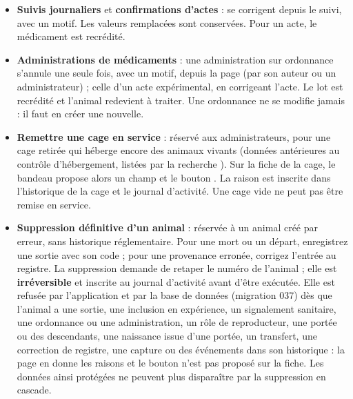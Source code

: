 \documentclass[11pt,a4paper]{article}
\begin{document}
\begin{itemize}
  \item \textbf{Suivis journaliers} et \textbf{confirmations d'actes} : se
    corrigent depuis le suivi, avec un motif. Les valeurs remplacées sont
    conservées. Pour un acte, le médicament est recrédité.
  \item \textbf{Administrations de médicaments} : une administration sur
    ordonnance s'annule une seule fois, avec un motif, depuis la page
     (par son auteur ou un administrateur) ; celle d'un
    acte expérimental, en corrigeant l'acte. Le lot est recrédité et
    l'animal redevient à traiter. Une ordonnance ne se modifie jamais : il
    faut en créer une nouvelle.
  \item \textbf{Remettre une cage en service} : réservé aux administrateurs,
    pour une cage retirée qui héberge encore des animaux vivants (données
    antérieures au contrôle d'hébergement, listées par la recherche
    ). Sur la fiche de la cage, le bandeau
     propose alors un champ  et le bouton
    . La raison est inscrite dans l'historique de
    la cage et le journal d'activité. Une cage vide ne peut pas être remise
    en service.
  \item \textbf{Suppression définitive d'un animal} : réservée à un animal
    créé par erreur, sans historique réglementaire. Pour une mort ou un
    départ, enregistrez une sortie avec son code ; pour une provenance
    erronée, corrigez l'entrée au registre. La suppression demande de retaper
    le numéro de l'animal ; elle est \textbf{irréversible} et inscrite au
    journal d'activité avant d'être exécutée. Elle est refusée par
    l'application et par la base de données (migration 037) dès que l'animal
    a une sortie, une inclusion en expérience, un signalement sanitaire, une
    ordonnance ou une administration, un rôle de reproducteur, une portée ou
    des descendants, une naissance issue d'une portée, un transfert, une
    correction de registre, une capture ou des événements dans son
    historique : la page en donne les raisons et le bouton n'est pas proposé
    sur la fiche. Les données ainsi protégées ne peuvent plus disparaître par
    la suppression en cascade.
\end{itemize}
\end{document}
